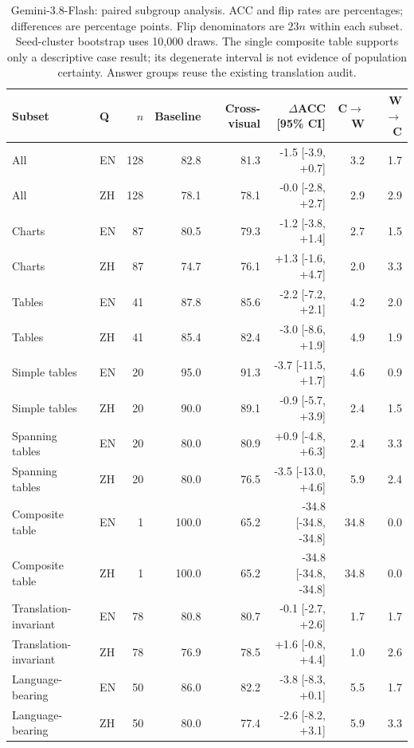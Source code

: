 \begin{table}[t]
\centering\scriptsize
\begin{tabular*}{\textwidth}{@{\extracolsep{\fill}}llrrrrrr@{}}
\toprule
Subset & Q & $n$ & Baseline & Cross-visual & $\Delta$ACC [95\% CI] & C$\to$W & W$\to$C \\
\midrule
All & EN & 128 & 82.8 & 81.3 & -1.5 [-3.9, +0.7] & 3.2 & 1.7 \\
All & ZH & 128 & 78.1 & 78.1 & -0.0 [-2.8, +2.7] & 2.9 & 2.9 \\
Charts & EN & 87 & 80.5 & 79.3 & -1.2 [-3.8, +1.4] & 2.7 & 1.5 \\
Charts & ZH & 87 & 74.7 & 76.1 & +1.3 [-1.6, +4.7] & 2.0 & 3.3 \\
Tables & EN & 41 & 87.8 & 85.6 & -2.2 [-7.2, +2.1] & 4.2 & 2.0 \\
Tables & ZH & 41 & 85.4 & 82.4 & -3.0 [-8.6, +1.9] & 4.9 & 1.9 \\
Simple tables & EN & 20 & 95.0 & 91.3 & -3.7 [-11.5, +1.7] & 4.6 & 0.9 \\
Simple tables & ZH & 20 & 90.0 & 89.1 & -0.9 [-5.7, +3.9] & 2.4 & 1.5 \\
Spanning tables & EN & 20 & 80.0 & 80.9 & +0.9 [-4.8, +6.3] & 2.4 & 3.3 \\
Spanning tables & ZH & 20 & 80.0 & 76.5 & -3.5 [-13.0, +4.6] & 5.9 & 2.4 \\
Composite table & EN & 1 & 100.0 & 65.2 & -34.8 [-34.8, -34.8] & 34.8 & 0.0 \\
Composite table & ZH & 1 & 100.0 & 65.2 & -34.8 [-34.8, -34.8] & 34.8 & 0.0 \\
Translation-invariant & EN & 78 & 80.8 & 80.7 & -0.1 [-2.7, +2.6] & 1.7 & 1.7 \\
Translation-invariant & ZH & 78 & 76.9 & 78.5 & +1.6 [-0.8, +4.4] & 1.0 & 2.6 \\
Language-bearing & EN & 50 & 86.0 & 82.2 & -3.8 [-8.3, +0.1] & 5.5 & 1.7 \\
Language-bearing & ZH & 50 & 80.0 & 77.4 & -2.6 [-8.2, +3.1] & 5.9 & 3.3 \\
\bottomrule\end{tabular*}
\caption{Gemini-3.8-Flash: paired subgroup analysis. ACC and flip rates are percentages; differences are percentage points. Flip denominators are $23n$ within each subset. Seed-cluster bootstrap uses 10,000 draws. The single composite table supports only a descriptive case result; its degenerate interval is not evidence of population certainty. Answer groups reuse the existing translation audit.}
\end{table}

